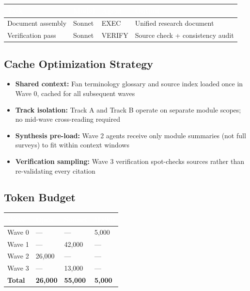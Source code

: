 \documentclass[11pt,letterpaper]{article}
\newcommand{\tableheader}[1]{\textbf{\sffamily\textcolor{white}{#1}}}
\begin{document}
\begin{center}
\begin{tabularx}{\textwidth}{L{2.5cm}C{1.5cm}C{2cm}X}
\toprule
{}
\tableheader{Task} & \tableheader{Model} & \tableheader{Agent} & \tableheader{Output} \\
\midrule
Document assembly & Sonnet & EXEC & Unified research document \\
Verification pass & Sonnet & VERIFY & Source check + consistency audit \\
\bottomrule
\end{tabularx}
\end{center}

\subsection{Cache Optimization Strategy}

\begin{itemize}[leftmargin=2em]
\item \textbf{Shared context:} Fan terminology glossary and source index loaded once in Wave 0, cached for all subsequent waves
\item \textbf{Track isolation:} Track A and Track B operate on separate module scopes; no mid-wave cross-reading required
\item \textbf{Synthesis pre-load:} Wave 2 agents receive only module summaries (not full surveys) to fit within context windows
\item \textbf{Verification sampling:} Wave 3 verification spot-checks sources rather than re-validating every citation
\end{itemize}

\subsection{Token Budget}

\begin{center}
\begin{tabularx}{\textwidth}{L{3cm}C{2cm}C{2cm}C{2cm}}
\toprule
{}
\tableheader{Wave} & \tableheader{Opus} & \tableheader{Sonnet} & \tableheader{Haiku} \\
\midrule
Wave 0 & --- & --- & 5,000 \\
Wave 1 & --- & 42,000 & --- \\
Wave 2 & 26,000 & --- & --- \\
Wave 3 & --- & 13,000 & --- \\
\midrule
\textbf{Total} & \textbf{26,000} & \textbf{55,000} & \textbf{5,000} \\
\bottomrule
\end{tabularx}
\end{center}
\end{document}
